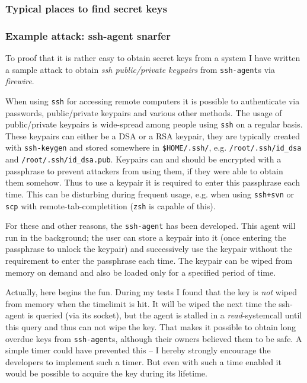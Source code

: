 \subsubsection{Typical places to find secret keys}

\subsubsection{Example attack: ssh-agent snarfer}

To proof that it is rather easy to obtain secret keys from a system I have
written a sample attack to obtain \emph{ssh public/private keypairs} from
\texttt{ssh-agent}s via \emph{firewire}.

When using \texttt{ssh} for accessing remote computers it is possible to
authenticate via passwords, public/private keypairs and various other methods.
The usage of public/private keypairs is wide-spread among people using
\texttt{ssh} on a regular basis. These keypairs can either be a DSA or a RSA
keypair, they are typically created with \texttt{ssh-keygen} and stored
somewhere in \texttt{\$HOME/.ssh/}, e.g.  \texttt{/root/.ssh/id\_dsa} and
\texttt{/root/.ssh/id\_dsa.pub}. Keypairs can and should be encrypted with a
passphrase to prevent attackers from using them, if they were able to obtain
them somehow. Thus to use a keypair it is required to enter this passphrase each
time. This can be disturbing during frequent usage, e.g. when using
\texttt{ssh+svn} or \texttt{scp} with remote-tab-completition (\texttt{zsh} is
capable of this).

For these and other reasons, the \texttt{ssh-agent} has been developed. This
agent will run in the background; the user can store a keypair into it (once
entering the passphrase to unlock the keypair) and successively use the keypair
without the requirement to enter the passphrase each time. The keypair can be
wiped from memory on demand and also be loaded only for a specified period of
time.

Actually, here begins the fun. During my tests I found that the key is
\emph{not} wiped from memory when the timelimit is hit. It will be wiped the
next time the ssh-agent is queried (via its socket), but the agent is stalled in
a \emph{read}-systemcall until this query and thus can not wipe the key. That
makes it possible to obtain long overdue keys from \texttt{ssh-agent}s, although
their owners believed them to be safe. A simple timer could have prevented this
-- I hereby strongly encourage the developers to implement such a timer. But
even with such a time enabled it would be possible to acquire the key during its
lifetime.

